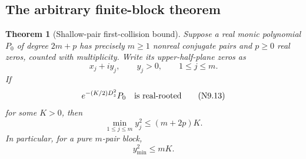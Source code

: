 \documentclass[11pt]{article}
\newtheorem{theorem}{Theorem}[section]
\theoremstyle{definition}
\theoremstyle{remark}
\begin{document}
\subsection{The arbitrary finite-block theorem}

\begin{theorem}[Shallow-pair first-collision bound]
\label{thm:f2v9-shallow}
Suppose a real monic polynomial \(P_0\) of degree \(2m+p\) has precisely
\(m\ge1\) nonreal conjugate pairs and \(p\ge0\) real zeros, counted with
multiplicity.  Write its upper-half-plane zeros as
\[
 x_j+iy_j,\qquad y_j>0,\qquad 1\le j\le m.
 \tag{N9.12}
\]
If
\[
 e^{-(K/2)D_z^2}P_0
 \quad\hbox{is real-rooted}
 \tag{N9.13}
\]
for some \(K>0\), then
\[
 \boxed{
 \min_{1\le j\le m}y_j^2\le(m+2p)K.}
 \tag{N9.14}
\]
In particular, for a pure \(m\)-pair block,
\[
 \boxed{y_{\min}^2\le mK.}
 \tag{N9.15}
\]
\end{theorem}
\end{document}
